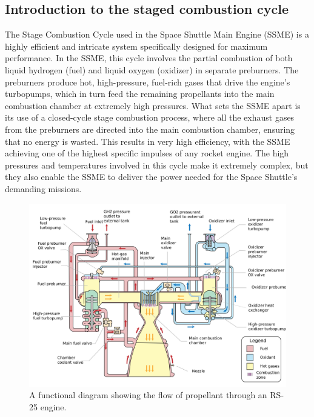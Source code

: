 \subsection{Introduction to the staged combustion cycle}
The Stage Combustion Cycle used in the Space Shuttle Main Engine (SSME) is a highly efficient and intricate system specifically designed for maximum performance.
In the SSME, this cycle involves the partial combustion of both liquid hydrogen (fuel) and liquid oxygen (oxidizer) in separate preburners. 
The preburners produce hot, high-pressure, fuel-rich gases that drive the engine's turbopumps, which in turn feed the remaining propellants into the main combustion chamber at extremely high pressures.
What sets the SSME apart is its use of a closed-cycle stage combustion process, where all the exhaust gases from the preburners are directed into the main combustion chamber, ensuring that no energy is wasted.
This results in very high efficiency, with the SSME achieving one of the highest specific impulses of any rocket engine.
The high pressures and temperatures involved in this cycle make it extremely complex, but they also enable the SSME to deliver the power needed for the Space Shuttle's demanding missions.
\begin{figure}[H]
	\centering
 \includegraphics[width=.50\textwidth]{ssme_ciclo}
	\caption{A functional diagram showing the flow of propellant through an RS-25 engine.}
	\label{fig:ssme_cycle}
\end{figure}


